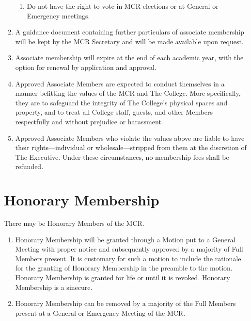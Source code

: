 \documentclass[11pt, a4paper]{article}
\begin{document}
\begin{enumerate}
\begin{enumerate}
        \item Do not have the right to vote in MCR elections or at General or Emergency meetings.
    \end{enumerate}
    \item A guidance document containing further particulars of associate membership will be kept by the MCR Secretary and will be made available upon request.
    \item Associate membership will expire at the end of each academic year, with the option for renewal by application and approval.
    \item Approved Associate Members are expected to conduct themselves in a manner befitting the values of the MCR and The College. More specifically, they are to safeguard the integrity of The College's physical spaces and property, and to treat all College staff, guests, and other Members respectfully and without prejudice or harassment.
    \item Approved Associate Members who violate the values above are liable to have their rights---individual or wholesale---stripped from them at the discretion of The Executive. Under these circumstances, no membership fees shall be refunded.
\end{enumerate}





\section{Honorary Membership}
\label{sec:honorary_membership}

There may be Honorary Members of the MCR.

\begin{enumerate}

    \item Honorary Membership will be granted through a Motion put to a General Meeting with proper notice and subsequently approved by a majority of Full Members present. It is customary for such a motion to include the rationale for the granting of Honorary Membership in the preamble to the motion. Honorary Membership is granted for life or until it is revoked. Honorary Membership is a sinecure.
    \item Honorary Membership can be removed by a majority of the Full Members present at a General or Emergency Meeting of the MCR.
\end{enumerate}
\end{document}
